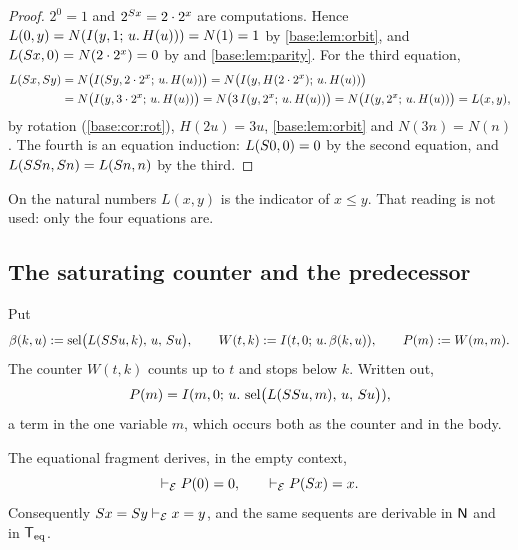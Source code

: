 \begin{proof}
$2^{0}=1$ and $2^{S x}=2\cdot 2^{x}$ are computations.  Hence
$L(0,y)=N(I(y,1;\,u.\,H(u)))=N(1)=1$ by \cref{base:lem:orbit}, and
$L(S x,0)=N(2\cdot 2^{x})=0$ by  and
\cref{base:lem:parity}.  For the third equation,
\begin{align*}
 L(S x,S y)
 &=N\bigl(I(S y,2\cdot 2^{x};\,u.\,H(u))\bigr)
  =N\bigl(I(y,H(2\cdot 2^{x});\,u.\,H(u))\bigr)\\
 &=N\bigl(I(y,3\cdot 2^{x};\,u.\,H(u))\bigr)
  =N\bigl(3\,I(y,2^{x};\,u.\,H(u))\bigr)
  =N\bigl(I(y,2^{x};\,u.\,H(u))\bigr)=L(x,y),
\end{align*}
by rotation (\cref{base:cor:rot}), $H(2u)=3u$, \cref{base:lem:orbit} and
$N(3n)=N(n)$.  The fourth is an equation induction: $L(S 0,0)=0$ by the
second equation, and $L(SS n,S n)=L(S n,n)$ by the third.
\end{proof}

On the natural numbers $L(x,y)$ is the indicator of $x\le y$.  That reading
is not used: only the four equations are.

\subsection{The saturating counter and the predecessor}

Put
\[
 \beta(k,u)\mathrel{:=}\operatorname{sel}\bigl(L(SS u,k),\,u,\,S u\bigr),\qquad
 W(t,k)\mathrel{:=}I(t,0;\,u.\,\beta(k,u)),\qquad
 P(m)\mathrel{:=} W(m,m).
\]
The counter $W(t,k)$ counts up to $t$ and stops below $k$.  Written out,
\[
 P(m)=I(m,0;\,u.\,\operatorname{sel}\bigl(L(SS u,m),\,u,\,S u\bigr)) ,
\]
a term in the one variable $m$, which occurs both as the counter and in the
body.

\begin{theorem}[Predecessor]
\label{base:thm:pred}
The equational fragment derives, in the empty context,
\[
 \vdash_{\mathcal E}P(0)=0,\qquad \vdash_{\mathcal E}P(S x)=x .
\]
Consequently $S x=S y\vdash_{\mathcal E}x=y$, and the same sequents
are derivable in $\mathsf{N}$ and in $\mathsf{T}_{\mathrm{eq}}$.
\end{theorem}

